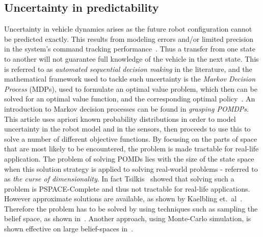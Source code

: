 \subsection{Uncertainty in predictability}
Uncertainty in vehicle dynamics arises as the future robot configuration cannot
be predicted exactly. This results from modeling errors and/or limited precision
in the system's command tracking
performance~\cite{dadkhahSurveyMotionPlanning2012}. Thus a transfer from one
state to another will not guarantee full knowledge of the vehicle in the next
state. This is referred to as \textit{automated sequential decision making} in
the literature, and the mathematical framework used to tackle such uncertainty
is the \textit{Markov Decision Process} (MDPs), used to formulate an optimal
value problem, which then can be solved for an optimal value function, and the
corresponding optimal policy~\cite{Cassandra:1998:EAA:926710}. An introduction
to Markov decision processes can be found in \textit{grasping
  POMDPs}\cite{kaelblingPlanningActingPartially1998}. This article uses apriori
known probability distributions in order to model uncertainty in the robot model
and in the sensors, then proceeds to use this to solve a number of different
objective functions. By focusing on the parts of space that are most likely to
be encountered, the problem is made tractable for real-life application. The
problem of solving POMDs lies with the size of the state space when this
solution strategy is applied to solving real-world problems - referred to as
\textit{the curse of dimensionality}. In fact
Tsilkis~\cite{christosh.papadimitriouComplexityMarkovDecision1987} showed that
solving such a problem is PSPACE-Complete and thus not tractable for real-life
applications. However approximate solutions are available, as shown by Kaelbling
et.\ al~\cite{kaelblingPlanningActingPartially1998}. Therefore the problem has
to be solved by using techniques such as sampling the belief space, as shown
in~\cite{kearnsSparseSamplingAlgorithm}. Another approach, using Monte-Carlo
simulation, is shown effective on large belief-spaces
in~\cite{silverMonteCarloPlanningLarge}.


